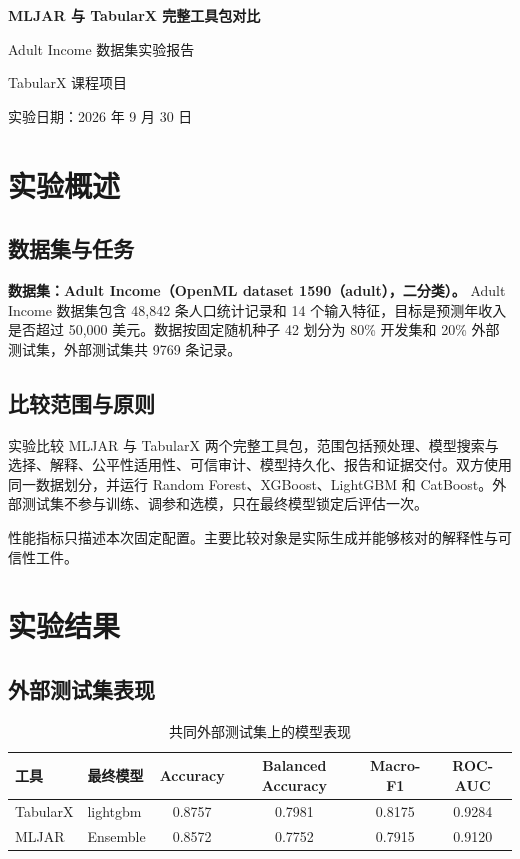 \documentclass[degree=bachelor,language=chinese,fontset=fandol]{thuthesis}
\begin{document}
\begin{titlepage}
  \centering
  \vspace*{2.3cm}
  {\bfseries MLJAR 与 TabularX 完整工具包对比\par}
  \vspace{1.2cm}
  {Adult Income 数据集实验报告\par}
  \vspace{2.2cm}
  {TabularX 课程项目\par}
  \vfill
  {实验日期：2026 年 9 月 30 日\par}
  \vspace{1.2cm}
\end{titlepage}

\frontmatter
\tableofcontents
\mainmatter
\chapter{实验概述}
\section{数据集与任务}
\textbf{数据集：Adult Income（OpenML dataset 1590（adult），二分类）。}
Adult Income 数据集包含 48,842 条人口统计记录和 14 个输入特征，目标是预测年收入是否超过 50,000 美元。数据按固定随机种子 42 划分为 80\% 开发集和 20\% 外部测试集，外部测试集共 9769 条记录。

\section{比较范围与原则}
实验比较 MLJAR 与 TabularX 两个完整工具包，范围包括预处理、模型搜索与选择、解释、公平性适用性、可信审计、模型持久化、报告和证据交付。双方使用同一数据划分，并运行 Random Forest、XGBoost、LightGBM 和 CatBoost。外部测试集不参与训练、调参和选模，只在最终模型锁定后评估一次。

性能指标只描述本次固定配置。主要比较对象是实际生成并能够核对的解释性与可信性工件。

\chapter{实验结果}
\section{外部测试集表现}
\begin{table}[htbp]
  \centering
  \small
  \caption{共同外部测试集上的模型表现}
  \begin{tabular}{llcccc}
    \toprule
    工具 & 最终模型 & Accuracy & Balanced Accuracy & Macro-F1 & ROC-AUC \\
    \midrule
    TabularX & lightgbm & 0.8757 & 0.7981 & 0.8175 & 0.9284 \\
    MLJAR & Ensemble & 0.8572 & 0.7752 & 0.7915 & 0.9120 \\
    \bottomrule
  \end{tabular}
\end{table}
\end{document}
